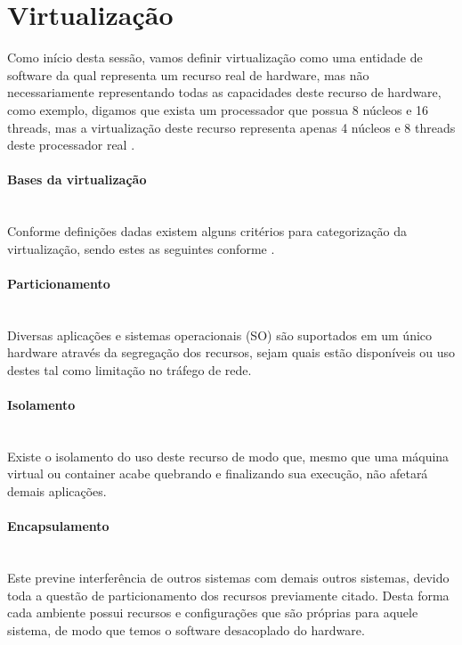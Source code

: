\section{Virtualização}
Como início desta sessão, vamos definir virtualização como uma entidade de software da qual representa um recurso real de hardware, mas não necessariamente representando todas as capacidades deste recurso de hardware, como exemplo, digamos que exista um processador que possua 8 núcleos e 16 threads, mas a virtualização deste recurso representa apenas 4 núcleos e 8 threads deste processador real \cite{virtualizacao_and_cloud}.

\paragraph*{Bases da virtualização}\mbox{}\\
Conforme definições dadas existem alguns critérios para categorização da virtualização, sendo estes as seguintes conforme \cite{Sareen2013CloudCT, virtualizacao_and_cloud}.

\paragraph*{Particionamento}\mbox{}\\
Diversas aplicações e sistemas operacionais (SO) são suportados em um único hardware através da segregação dos recursos, sejam quais estão disponíveis ou uso destes tal como limitação no tráfego de rede.

\paragraph*{Isolamento}\mbox{}\\
Existe o isolamento do uso deste recurso de modo que, mesmo que uma máquina virtual ou container acabe quebrando e finalizando sua execução, não afetará demais aplicações.

\paragraph*{Encapsulamento}\mbox{}\\
Este previne interferência de outros sistemas com demais outros sistemas, devido toda a questão de particionamento dos recursos previamente citado. Desta forma cada ambiente possui recursos e configurações que são próprias para aquele sistema, de modo que temos o software desacoplado do hardware.


